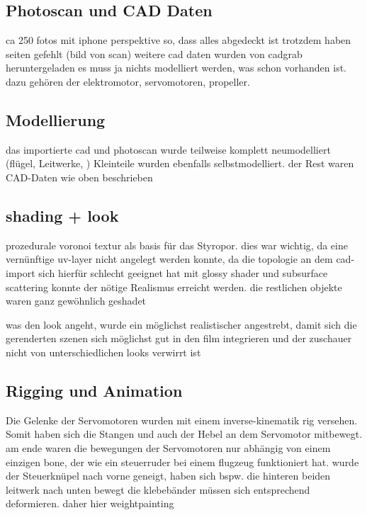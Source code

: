 \subsection{Photoscan und CAD Daten}

ca 250 fotos mit iphone
perspektive so, dass alles abgedeckt ist
trotzdem haben seiten gefehlt
(bild von scan)
weitere cad daten wurden von cadgrab heruntergeladen
es muss ja nichts modelliert werden, was schon vorhanden ist.
dazu gehören der elektromotor, servomotoren, propeller.


\subsection{Modellierung}

das importierte cad und photoscan wurde teilweise komplett neumodelliert (flügel, Leitwerke, )
Kleinteile wurden ebenfalls selbstmodelliert.
der Rest waren CAD-Daten wie oben beschrieben

\subsection{shading + look}

prozedurale voronoi textur als basis für das Styropor. 
dies war wichtig, da eine vernünftige uv-layer nicht angelegt werden konnte, da die topologie an dem cad-import sich hierfür schlecht geeignet hat
mit glossy shader und subsurface scattering konnte der nötige Realismus erreicht werden.
die restlichen objekte waren ganz gewöhnlich geshadet

was den look angeht, wurde ein möglichst realistischer angestrebt, damit sich die gerenderten szenen sich möglichst gut in den film integrieren und der zuschauer nicht von unterschiedlichen looks verwirrt ist

\subsection{Rigging und Animation}

Die Gelenke der Servomotoren wurden mit einem inverse-kinematik rig versehen. Somit haben sich die Stangen und auch der Hebel an dem Servomotor mitbewegt.
am ende waren die bewegungen der Servomotoren nur abhängig von einem einzigen bone, der wie ein steuerruder bei einem flugzeug funktioniert hat.
wurde der Steuerknüpel nach vorne geneigt, haben sich bspw. die hinteren beiden  leitwerk nach unten bewegt
die klebebänder müssen sich entsprechend deformieren.
daher hier weightpainting

